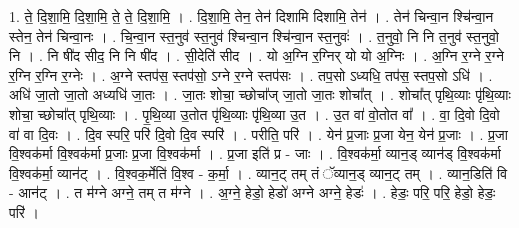 \documentclass[17pt]{extarticle}
\begin{document}
1. ते॒ दि॒शा॒मि॒ दि॒शा॒मि॒ ते॒ ते॒ दि॒शा॒मि॒ । . दि॒शा॒मि॒ तेन॒ तेन॑ दिशामि दिशामि॒ तेन॑ । . तेन॑ चिन्वा॒न श्चि॑न्वा॒न स्तेन॒ तेन॑ चिन्वा॒नः । . चि॒न्वा॒न स्त॒नुव॑ स्त॒नुव॑ श्चिन्वा॒न श्चि॑न्वा॒न स्त॒नुवः॑ । . त॒नुवो॒ नि नि त॒नुव॑ स्त॒नुवो॒ नि । . नि षी॑द सीद॒ नि नि षी॑द । . सी॒देति॑ सीद । . यो अ॒ग्नि र॒ग्निर् यो यो अ॒ग्निः । . अ॒ग्नि र॒ग्ने र॒ग्ने र॒ग्नि र॒ग्नि र॒ग्नेः । . अ॒ग्ने स्तप॑स॒ स्तप॑सो॒ ऽग्ने र॒ग्ने स्तप॑सः । . तप॒सो ऽध्यधि॒ तप॑स॒ स्तप॒सो ऽधि॑ । . अधि॑ जा॒तो जा॒तो अध्यधि॑ जा॒तः । . जा॒तः शोचा॒ च्छोचा᳚ज् जा॒तो जा॒तः शोचा᳚त् । . शोचा᳚त् पृथि॒व्याः पृ॑थि॒व्याः शोचा॒ च्छोचा᳚त् पृथि॒व्याः । . पृ॒थि॒व्या उ॒तोत पृ॑थि॒व्याः पृ॑थि॒व्या उ॒त । . उ॒त वा॑ वो॒तोत वा᳚ । . वा॒ दि॒वो दि॒वो वा॑ वा दि॒वः । . दि॒व स्परि॒ परि॑ दि॒वो दि॒व स्परि॑ । . परीति॒ परि॑ । . येन॑ प्र॒जाः प्र॒जा येन॒ येन॑ प्र॒जाः । . प्र॒जा वि॒श्वक॑र्मा वि॒श्वक॑र्मा प्र॒जाः प्र॒जा वि॒श्वक॑र्मा । . प्र॒जा इति॑ प्र - जाः । . वि॒श्वक॑र्मा॒ व्यान॒ड् व्यान॑ड् वि॒श्वक॑र्मा वि॒श्वक॑र्मा॒ व्यान॑ट् । . वि॒श्वक॒र्मेति॑ वि॒श्व - क॒र्मा॒ । . व्यान॒ट् तम् तं ॅव्यान॒ड् व्यान॒ट् तम् । . व्यान॒डिति॑ वि - आन॑ट् । . त म॑ग्ने अग्ने॒ तम् त म॑ग्ने । . अ॒ग्ने॒ हेडो॒ हेडो॑ अग्ने अग्ने॒ हेडः॑ । . हेडः॒ परि॒ परि॒ हेडो॒ हेडः॒ परि॑ । \newline
\end{document}
